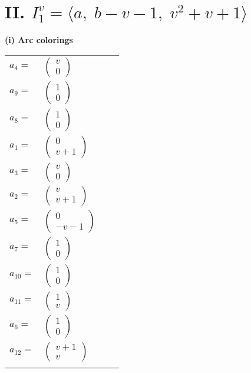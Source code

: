 \documentclass[1p]{elsarticle_modified}
\theoremstyle{definition}
\begin{document}
\centering \section*{II. $I^v_{1}= \langle a,\;b- v-1,\;v^2+v+1 \rangle$}
\flushleft \textbf{(i) Arc colorings}\\
\begin{tabular}{m{7pt} m{180pt} m{7pt} m{180pt} }
\flushright $a_{4}=$&$\begin{pmatrix}v\\0\end{pmatrix}$ \\
\flushright $a_{9}=$&$\begin{pmatrix}1\\0\end{pmatrix}$ \\
\flushright $a_{8}=$&$\begin{pmatrix}1\\0\end{pmatrix}$ \\
\flushright $a_{1}=$&$\begin{pmatrix}0\\v+1\end{pmatrix}$ \\
\flushright $a_{3}=$&$\begin{pmatrix}v\\0\end{pmatrix}$ \\
\flushright $a_{2}=$&$\begin{pmatrix}v\\v+1\end{pmatrix}$ \\
\flushright $a_{5}=$&$\begin{pmatrix}0\\- v-1\end{pmatrix}$ \\
\flushright $a_{7}=$&$\begin{pmatrix}1\\0\end{pmatrix}$ \\
\flushright $a_{10}=$&$\begin{pmatrix}1\\0\end{pmatrix}$ \\
\flushright $a_{11}=$&$\begin{pmatrix}1\\v\end{pmatrix}$ \\
\flushright $a_{6}=$&$\begin{pmatrix}1\\0\end{pmatrix}$ \\
\flushright $a_{12}=$&$\begin{pmatrix}v+1\\v\end{pmatrix}$\\&\end{tabular}
\end{document}
